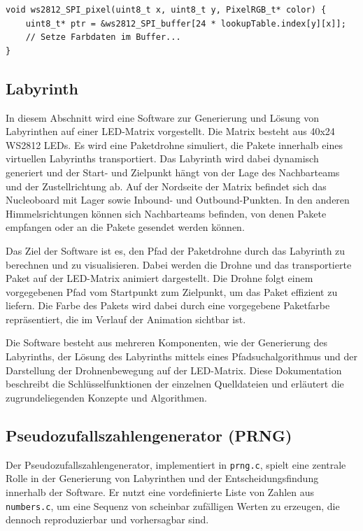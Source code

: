 \begin{lstlisting}[style=CStyle]
void ws2812_SPI_pixel(uint8_t x, uint8_t y, PixelRGB_t* color) {
    uint8_t* ptr = &ws2812_SPI_buffer[24 * lookupTable.index[y][x]];
    // Setze Farbdaten im Buffer...
}
\end{lstlisting}

\subsection{Labyrinth} \label{Labyrinth}
In diesem Abschnitt wird eine Software zur Generierung und Lösung von Labyrinthen auf einer LED-Matrix vorgestellt. Die Matrix besteht aus 40x24 WS2812 LEDs. Es wird eine Paketdrohne simuliert, die Pakete innerhalb eines virtuellen Labyrinths transportiert. Das Labyrinth wird dabei dynamisch generiert und der Start- und Zielpunkt hängt von der Lage des Nachbarteams und der Zustellrichtung ab. Auf der Nordseite der Matrix befindet sich das Nucleoboard mit Lager sowie Inbound- und Outbound-Punkten. In den anderen Himmelsrichtungen können sich Nachbarteams befinden, von denen Pakete empfangen oder an die Pakete gesendet werden können.

Das Ziel der Software ist es, den Pfad der Paketdrohne durch das Labyrinth zu berechnen und zu visualisieren. Dabei werden die Drohne und das transportierte Paket auf der LED-Matrix animiert dargestellt. Die Drohne folgt einem vorgegebenen Pfad vom Startpunkt zum Zielpunkt, um das Paket effizient zu liefern. Die Farbe des Pakets wird dabei durch eine vorgegebene Paketfarbe repräsentiert, die im Verlauf der Animation sichtbar ist.

Die Software besteht aus mehreren Komponenten, wie der Generierung des Labyrinths, der Lösung des Labyrinths mittels eines Pfadsuchalgorithmus und der Darstellung der Drohnenbewegung auf der LED-Matrix. Diese Dokumentation beschreibt die Schlüsselfunktionen der einzelnen Quelldateien und erläutert die zugrundeliegenden Konzepte und Algorithmen.

\subsection{Pseudozufallszahlengenerator (PRNG)}

Der Pseudozufallszahlengenerator, implementiert in \texttt{prng.c}, spielt eine zentrale Rolle in der Generierung von Labyrinthen und der Entscheidungsfindung innerhalb der Software. Er nutzt eine vordefinierte Liste von Zahlen aus \texttt{numbers.c}, um eine Sequenz von scheinbar zufälligen Werten zu erzeugen, die dennoch reproduzierbar und vorhersagbar sind.

